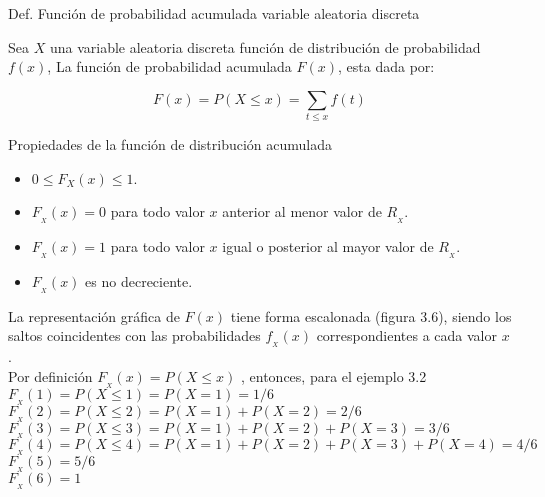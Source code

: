 \documentclass[base=hide,12pt]{elegantbook}
\begin{document}
\begin{Box4}{Def. Función de probabilidad acumulada variable aleatoria discreta}
	
	Sea $X$ una variable aleatoria discreta función de distribución de probabilidad $f(x)$, La función de probabilidad acumulada $F(x)$, esta dada por:
	
	$$F(x) = P(X \leq x) = \sum_{t\leq x} f(t) $$
\end{Box4}
\vspace{1cm}
\begin{Box2}{Propiedades de la función de distribución acumulada}

\begin{itemize}
	\item $0\leq F_{X}(x) \leq 1 $.
	\item $F_{_{X}}(x) = 0$ para todo valor $x$ anterior al menor valor de $R_{_{X}}$.
	\item $F_{_{X}}(x)=1$ para todo valor $x$ igual o posterior al mayor valor de $R_{_{X}}$.
	\item $F_{_{X}}(x)$ es no decreciente.
\end{itemize}
\end{Box2}	
La representación gráfica de $F(x)$ tiene forma escalonada (figura 3.6), siendo los saltos coincidentes con las probabilidades $f_{_{X}}(x)$ correspondientes a cada valor $x$ .\\

Por definición $F_{_{X}}(x)=P(X \leq x)$ , entonces, para el ejemplo 3.2  \\
%
$F_{_{X}}(1) = P(X \leq 1) = P(X=1)=1/6$ \\
$F_{_{X}}(2) = P( X\leq 2) = P(X=1)+P(X=2)=2/6$ \\
$F_{_{X}}(3) = P( X\leq 3) = P(X=1)+P(X=2)+ P(X=3)=3/6$ \\
$F_{_{X}}(4) = P( X\leq 4) = P(X=1)+P(X=2)+P(X=3)+P(X=4)=4/6$ 
$F_{_{X}}(5)=5/6$ \\
$F_{_{X}}(6)=1$ \\
%
\end{document}
